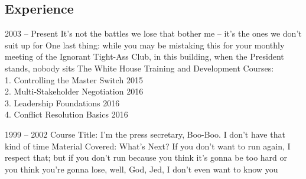 \documentclass{rmjCV}
\begin{document}
\begin{paracol}{2}
\begin{rightcolumn}
\section{Experience}
 {2003 -- Present}
\experienceitems
{It's not the battles we lose that bother me -- it's the ones we don't suit up for}
{One last thing: while you may be mistaking this for your monthly meeting of the Ignorant Tight-Ass Club, in this building, when the President stands, nobody sits}
{The White House Training and Development Courses:\\
1. Controlling the Master Switch 2015\\
2. Multi-Stakeholder Negotiation 2016\\
3. Leadership Foundations 2016\\
4. Conflict Resolution Basics 2016}

 {1999 -- 2002}
\experienceitems
{Course Title: I'm the press secretary, Boo-Boo. I don't have that kind of time}
{Material Covered: What's Next?}
{If you don't want to run again, I respect that; but if you don't run because you think it's gonna be too hard or you think you're gonna lose, well, God, Jed, I don't even want to know you}

\end{rightcolumn}

\end{paracol}
\end{document}
